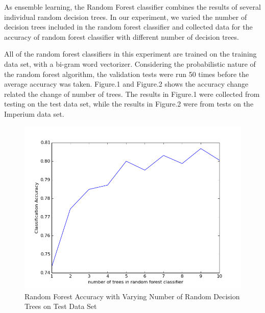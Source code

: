 \documentclass[11pt]{article}
\begin{document}
As ensemble learning, the Random Forest classifier combines the results of
several individual random decision trees. In our experiment, we varied the
number of decision trees included in the random forest classifier and collected
data for the accuracy of random forest classifier with different number of
decision trees.

All of the random forest classifiers in this experiment are trained on the
training data set, with a bi-gram word vectorizer. Considering the
probabilistic nature of the random forest algorithm, the validation tests were
run 50 times before the average accuracy was taken. Figure.1 and Figure.2 shows
the accuracy change related the change of number of trees. The results in
Figure.1 were collected from testing on the test data set, while the results in
Figure.2 were from tests on the Imperium data set.

\begin{figure}[h]
    \centering
    \includegraphics[scale=0.5]{RF_50run_test.png}
    \caption{Random Forest Accuracy with Varying Number of Random Decision Trees on Test Data Set}
    \label{fig:my_label}
\end{figure}
\end{document}
